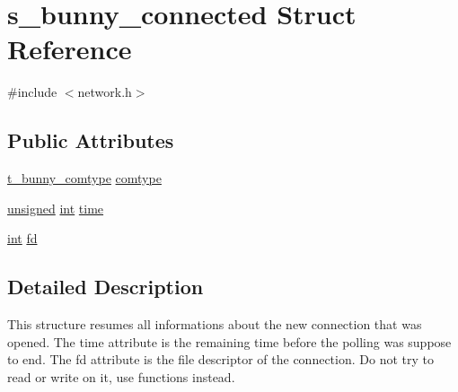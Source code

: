 \hypertarget{structs__bunny__connected}{\section{s\-\_\-bunny\-\_\-connected Struct Reference}
\label{structs__bunny__connected}
}


{\ttfamily \#include $<$network.\-h$>$}

\subsection*{Public Attributes}
\begin{DoxyCompactItemize}
\item 
\hyperlink{network_8h_ac01621d0080b82d3bebc95c8338b24ce}{t\-\_\-bunny\-\_\-comtype} \hyperlink{structs__bunny__connected_a10429ece6d8cca149992d92ee3a5684d}{comtype}
\item 
\hyperlink{curses_8priv_8h_aca40206900cfc164654362fa8d4ad1e6}{unsigned} \hyperlink{term__entry_8h_ad65b480f8c8270356b45a9890f6499ae}{int} \hyperlink{structs__bunny__connected_a10083f6f6c89f528e8343c7f461d84d1}{time}
\item 
\hyperlink{term__entry_8h_ad65b480f8c8270356b45a9890f6499ae}{int} \hyperlink{structs__bunny__connected_a7a9cb31b03a175341ac351004544d76b}{fd}
\end{DoxyCompactItemize}


\subsection{Detailed Description}
This structure resumes all informations about the new connection that was opened. The time attribute is the remaining time before the polling was suppose to end. The fd attribute is the file descriptor of the connection. Do not try to read or write on it, use functions instead. 

